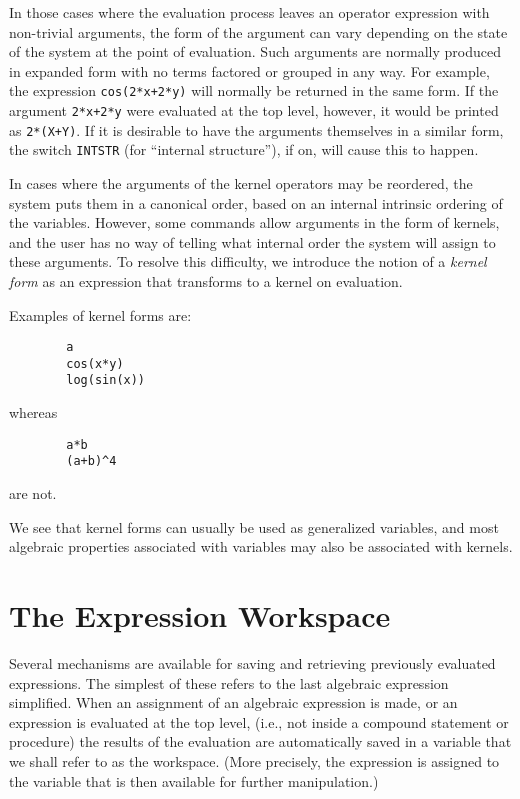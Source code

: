 \hypertarget{switch:INTSTR}{}
In those cases where the evaluation process leaves an operator expression
with non-trivial arguments, the form of the argument can vary depending on
the state of the system at the point of evaluation.  Such arguments are
normally produced in expanded form with no terms factored or grouped in
any way.  For example, the expression \texttt{cos(2*x+2*y)} will normally be
returned in the same form.  If the argument \texttt{2*x+2*y} were evaluated
at the top level, however, it would be printed as \texttt{2*(X+Y)}.  If it is
desirable to have the arguments themselves in a similar form, the switch
\texttt{INTSTR} (for ``internal structure''), if on, will
cause this to happen.

In cases where the arguments of the kernel operators may be reordered, the
system puts them in a canonical order, based on an internal intrinsic
ordering of the variables. However, some commands allow arguments in the
form of kernels, and the user has no way of telling what internal order the
system will assign to these arguments. To resolve this difficulty, we
introduce the notion of a \emph{kernel form} as an
expression that transforms to a kernel on evaluation.

Examples of kernel forms are:
\begin{verbatim}
        a
        cos(x*y)
        log(sin(x))
\end{verbatim}
whereas
\begin{verbatim}
        a*b
        (a+b)^4
\end{verbatim}
are not.

We see that kernel forms can usually be used as generalized variables, and
most algebraic properties associated with variables may also be associated
with kernels.

\section{The Expression Workspace}

Several mechanisms are available for saving and retrieving previously
evaluated expressions.  The simplest of these refers to the last algebraic
expression simplified.  When an assignment of an algebraic expression is
made, or an expression is evaluated at the top level, (i.e., not inside a
compound statement or procedure) the results of the evaluation are
automatically saved in a variable  that we shall refer to as the
workspace. (More precisely, the expression is assigned to the variable
 that is then available for further manipulation.)

